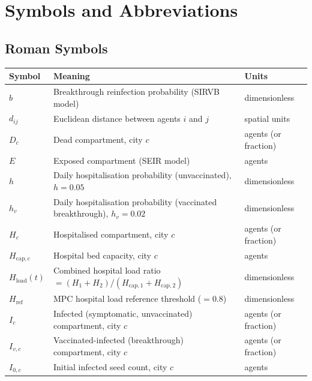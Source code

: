 

\chapter*{Symbols and Abbreviations}

\section*{Roman Symbols}

\begin{tabular}{@{}lll@{}}
\toprule
\textbf{Symbol} & \textbf{Meaning} & \textbf{Units} \\
\midrule
$b$         & Breakthrough reinfection probability (SIRVB model)              & dimensionless \\
$d_{ij}$    & Euclidean distance between agents $i$ and $j$                   & spatial units \\
$D_c$       & Dead compartment, city $c$                                      & agents (or fraction) \\
$E$         & Exposed compartment (SEIR model)                                & agents \\
$h$         & Daily hospitalisation probability (unvaccinated), $h=0.05$      & dimensionless \\
$h_v$       & Daily hospitalisation probability (vaccinated breakthrough), $h_v=0.02$ & dimensionless \\
$H_c$       & Hospitalised compartment, city $c$                              & agents (or fraction) \\
$H_{\mathrm{cap,c}}$ & Hospital bed capacity, city $c$                       & agents \\
$H_{\mathrm{load}}(t)$ & Combined hospital load ratio $= (H_1+H_2)/(H_{\mathrm{cap,1}}+H_{\mathrm{cap,2}})$ & dimensionless \\
$H_{\mathrm{ref}}$ & MPC hospital load reference threshold ($=0.8$)           & dimensionless \\
$I_c$       & Infected (symptomatic, unvaccinated) compartment, city $c$      & agents (or fraction) \\
$I_{v,c}$   & Vaccinated-infected (breakthrough) compartment, city $c$        & agents (or fraction) \\
$I_{0,c}$   & Initial infected seed count, city $c$                          & agents \\

\end{tabular}

